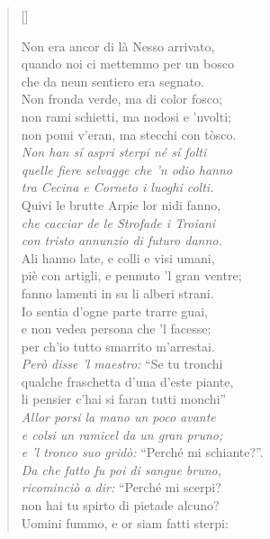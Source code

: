 \documentclass{article}
\begin{document}
\begin{verse}[\versewidth]
  \begin{patverse*}
    Non era ancor di là Nesso arrivato,\\
    quando noi ci mettemmo per un bosco\\
    che da neun sentiero era segnato.\\
    Non fronda verde, ma di color fosco;\\
    non rami schietti, ma nodosi e 'nvolti;\\
    non pomi v'eran, ma stecchi con tòsco.\\
    \emph{Non han sí aspri sterpi né sí folti \\
    quelle fiere selvagge che 'n odio hanno\\
    tra Cecina e Corneto i luoghi colti.}\\
    Quivi le brutte Arpie lor nidi fanno,\\
    \emph{che cacciar de le Strofade i Troiani\\
    con tristo annunzio di futuro danno.}\\
    Ali hanno late, e colli e visi umani,\\
    piè con artigli, e pennuto 'l gran ventre;\\
    fanno lamenti in su li alberi strani.\\[10pt]
    Io sentia d'ogne parte trarre guai,\\
    e non vedea persona che 'l facesse;\\
    per ch'io tutto smarrito m'arrestai. \\[10pt]
    \emph{Però disse 'l maestro:} ``Se tu tronchi\\
    qualche fraschetta d'una d'este piante,\\
    li pensier c'hai si faran tutti monchi''\\
    \emph{Allor porsi la mano un poco avante\\
    e colsi un ramicel da un gran pruno;\\
    e 'l tronco suo gridò:} ``Perché mi schiante?''.\\
    \emph{Da che fatto fu poi di sangue bruno,\\
    ricominciò a dir:} ``Perché mi scerpi?\\
    non hai tu spirto di pietade alcuno?\\
    Uomini fummo, e or siam fatti sterpi:\\

\end{patverse*}
\end{verse}
\end{document}
